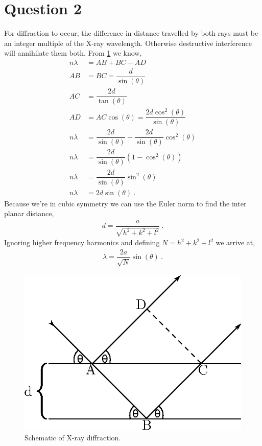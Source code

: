 \documentclass[a4paper]{article}
\begin{document}
	\section{Question 2}
	For diffraction to occur, the difference in distance travelled by both rays must be an integer multiple of the X-ray wavelength. Otherwise destructive interference will annihilate them both. From \cref{f:xraydiff} we know,
	\begin{subequations}
		\begin{align}
			n \lambda &= AB + BC - AD  \\
			AB &= BC = \dfrac{d}{\sin(\theta)} \\
			AC &= \dfrac{2 d}{\tan(\theta)} \\
			AD &= AC \cos(\theta) = \dfrac{2 d \cos^{2}(\theta)}{\sin(\theta)} \\
			n \lambda &= \dfrac{2 d}{\sin(\theta)} - \dfrac{2 d}{\sin(\theta)} \cos^{2}(\theta) \\
			n \lambda &= \dfrac{2 d}{\sin(\theta)} \left(1 - \cos^{2}(\theta)\right) \\
			n \lambda &= \dfrac{2 d}{\sin(\theta)} \sin^{2}(\theta) \\
			n \lambda &= 2 d \sin(\theta)~.
		\end{align}
	\end{subequations}
	Because we're in cubic symmetry we can use the Euler norm to find the inter planar distance,
	\begin{align}
		d = \dfrac{a}{\sqrt{h^{2} + k^{2} + l^{2}}}~.
	\end{align}
	Ignoring higher frequency harmonics and defining $N = h^{2} + k^{2} + l^{2}$ we arrive at,
	\begin{align}
		\lambda = \dfrac{2a}{\sqrt{N}} \sin(\theta)~.
	\end{align}
	\begin{figure}
		\centering
		\includegraphics[width=0.33\linewidth]{bragg.eps}
		\caption{Schematic of X-ray diffraction.}
		\label{f:xraydiff}
	\end{figure}
\end{document}
